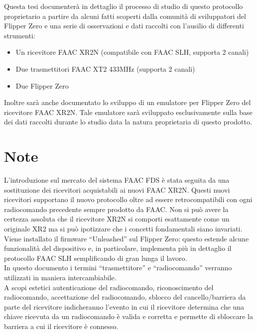 Questa tesi documenterà in dettaglio il processo di studio di questo protocollo proprietario a partire da alcuni fatti scoperti dalla comunità di sviluppatori del Flipper Zero e una serie di osservazioni e dati raccolti con l’ausilio di differenti strumenti:
\begin{itemize}
  \item Un ricevitore FAAC XR2N (compatibile con FAAC SLH, supporta 2 canali)
  \item Due trasmettitori FAAC XT2 433MHz (supporta 2 canali)
  \item Due Flipper Zero
\end{itemize}
Inoltre sarà anche documentato lo sviluppo di un emulatore per Flipper Zero del ricevitore FAAC XR2N. Tale emulatore sarà sviluppato esclusivamente sulla base dei dati raccolti durante lo studio data la natura proprietaria di questo prodotto.\\

\section{Note}
\label{sec:notes}

L’introduzione sul mercato del sistema FAAC FDS è stata seguita da una sostituzione dei ricevitori acquistabili ai nuovi FAAC XR2N. Questi nuovi ricevitori supportano il nuovo protocollo oltre ad essere retrocompatibili con ogni radiocomando precedente sempre prodotto da FAAC. Non si può avere la certezza assoluta che il ricevitore XR2N si comporti esattamente come un originale XR2 ma si può ipotizzare che i concetti fondamentali siano invariati.\\
Viene installato il firmware “Unleashed” \cite{firmware} sul Flipper Zero: questo estende alcune funzionalità del dispositivo e, in particolare, implementa più in dettaglio il protocollo FAAC SLH semplificando di gran lunga il lavoro.\\
In questo documento i termini “trasmettitore” e “radiocomando” verranno utilizzati in maniera intercambiabile.\\
A scopi estetici autenticazione del radiocomando, riconoscimento del radiocomando, accettazione del radiocomando, sblocco del cancello/barriera da parte del ricevitore indicheranno l’evento in cui il ricevitore determina che una chiave ricevuta da un radiocomando è valida e corretta e permette di sbloccare la barriera a cui il ricevitore è connesso.\\
